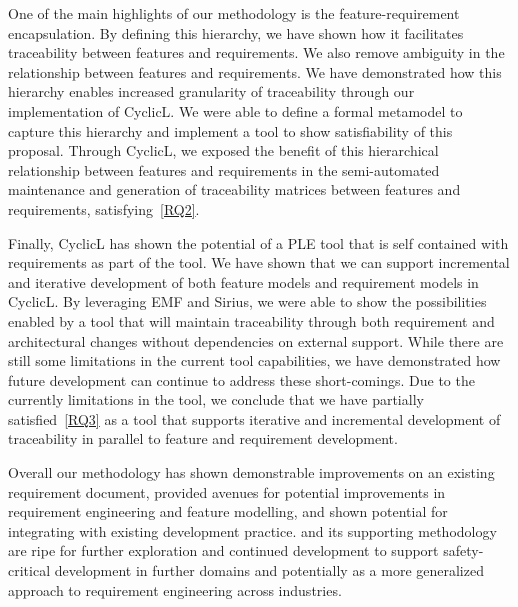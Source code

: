 One of the main highlights of our methodology is the feature-requirement encapsulation. By defining this hierarchy, we have shown how it facilitates traceability between features and requirements. We also remove ambiguity in the relationship between features and requirements. We have demonstrated how this hierarchy enables increased granularity of traceability through our implementation of CyclicL. We were able to define a formal metamodel to capture this hierarchy and implement a tool to show satisfiability of this proposal. Through CyclicL, we exposed the benefit of this hierarchical relationship between features and requirements in the semi-automated maintenance and generation of traceability matrices between features and requirements, satisfying~\ref{RQ2}.


Finally, CyclicL has shown the potential of a \ac{PLE} tool that is self contained with requirements as part of the tool. We have shown that we can support incremental and iterative development of both feature models and requirement models in CyclicL. By leveraging \ac{EMF} and Sirius, we were able to show the possibilities enabled by a tool that will maintain traceability through both requirement and architectural changes without dependencies on external support. While there are still some limitations in the current tool capabilities, we have demonstrated how future development can continue to address these short-comings. Due to the currently limitations in the tool, we conclude that we have partially satisfied~\ref{RQ3} as a tool that supports iterative and incremental development of traceability in parallel to feature and requirement development.

Overall our methodology has shown demonstrable improvements on an existing requirement document, provided avenues for potential improvements in requirement engineering and feature modelling, and shown potential for integrating with existing development practice. \tool and its supporting methodology are ripe for further exploration and continued development to support safety-critical development in further domains and potentially as a more generalized approach to requirement engineering across industries.

